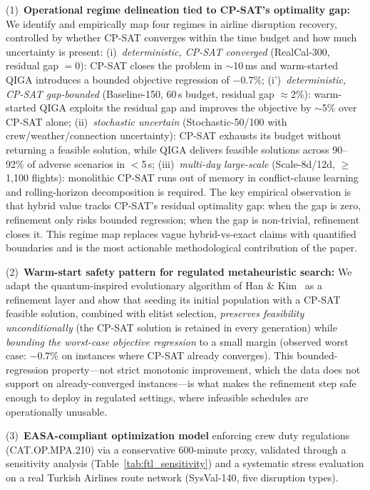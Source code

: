 \documentclass[12pt,number]{elsarticle}
\begin{document}
(1)~\textbf{Operational regime delineation tied to CP-SAT's optimality gap:} We identify and empirically map four regimes in airline disruption recovery, controlled by whether CP-SAT converges within the time budget and how much uncertainty is present: (i)~\emph{deterministic, CP-SAT converged} (RealCal-300, residual gap $=0$): CP-SAT closes the problem in $\sim$10\,ms and warm-started QIGA introduces a bounded objective regression of $-0.7\%$; (i')~\emph{deterministic, CP-SAT gap-bounded} (Baseline-150, 60\,s budget, residual gap $\approx$2\%): warm-started QIGA exploits the residual gap and improves the objective by $\sim$5\% over CP-SAT alone; (ii)~\emph{stochastic uncertain} (Stochastic-50/100 with crew/weather/connection uncertainty): CP-SAT exhausts its budget without returning a feasible solution, while QIGA delivers feasible solutions across 90--92\% of adverse scenarios in $<$5\,s; (iii)~\emph{multi-day large-scale} (Scale-8d/12d, $\geq$1{,}100 flights): monolithic CP-SAT runs out of memory in conflict-clause learning and rolling-horizon decomposition is required. The key empirical observation is that hybrid value tracks CP-SAT's residual optimality gap: when the gap is zero, refinement only risks bounded regression; when the gap is non-trivial, refinement closes it. This regime map replaces vague hybrid-vs-exact claims with quantified boundaries and is the most actionable methodological contribution of the paper.

(2)~\textbf{Warm-start safety pattern for regulated metaheuristic search:} We adapt the quantum-inspired evolutionary algorithm of Han \& Kim~\cite{han2002} as a refinement layer and show that seeding its initial population with a CP-SAT feasible solution, combined with elitist selection, \emph{preserves feasibility unconditionally} (the CP-SAT solution is retained in every generation) while \emph{bounding the worst-case objective regression} to a small margin (observed worst case: $-0.7\%$ on instances where CP-SAT already converges). This bounded-regression property---not strict monotonic improvement, which the data does not support on already-converged instances---is what makes the refinement step safe enough to deploy in regulated settings, where infeasible schedules are operationally unusable.

(3)~\textbf{EASA-compliant optimization model} enforcing crew duty regulations (CAT.OP.MPA.210) via a conservative 600-minute proxy, validated through a sensitivity analysis (Table~\ref{tab:ftl_sensitivity}) and a systematic stress evaluation on a real Turkish Airlines route network (SysVal-140, five disruption types).
\end{document}
